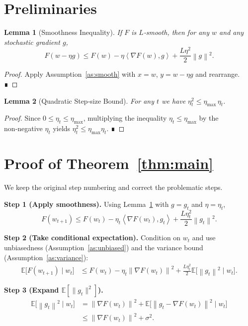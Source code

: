 \documentclass{article}
\newtheorem{lemma}{Lemma}
\newcommand{\E}{\mathbb{E}}
\newcommand{\norm}[1]{\left\|#1\right\|}
\newcommand{\inner}[2]{\left\langle #1,#2\right\rangle}
\begin{document}
\section*{Preliminaries}
\begin{lemma}[Smoothness Inequality]\label{lem:smooth}
If $F$ is $L$‑smooth, then for any $w$ and any stochastic gradient $g$,
\[
F(w-\eta g)
\le F(w)-\eta\inner{\nabla F(w)}{g}
+\frac{L\eta^{2}}{2}\norm{g}^{2}.
\]
\end{lemma}
\begin{proof}
Apply Assumption~\ref{as:smooth} with $x=w$, $y=w-\eta g$ and rearrange. ∎
\end{proof}

\begin{lemma}[Quadratic Step‑size Bound]\label{lem:quad}
For any $t$ we have $\eta_{t}^{2}\le\eta_{\max}\,\eta_{t}$.
\end{lemma}
\begin{proof}
Since $0\le\eta_{t}\le\eta_{\max}$, multiplying the inequality $\eta_{t}\le\eta_{\max}$ by the non‑negative $\eta_{t}$ yields $\eta_{t}^{2}\le\eta_{\max}\eta_{t}$. ∎
\end{proof}

\section*{Proof of Theorem~\ref{thm:main}}
We keep the original step numbering and correct the problematic steps.

\noindent\textbf{Step 1 (Apply smoothness).}  
Using Lemma~\ref{lem:smooth} with $g=g_{t}$ and $\eta=\eta_{t}$,
\[
F(w_{t+1})\le F(w_{t})-\eta_{t}\inner{\nabla F(w_{t})}{g_{t}}
+\frac{L\eta_{t}^{2}}{2}\norm{g_{t}}^{2}.
\tag{2}
\]

\noindent\textbf{Step 2 (Take conditional expectation).}  
Condition on $w_{t}$ and use unbiasedness (Assumption~\ref{as:unbiased}) and the variance bound (Assumption~\ref{as:variance}):
\[
\begin{aligned}
\E\!\big[F(w_{t+1})\mid w_{t}\big]
&\le F(w_{t})-\eta_{t}\norm{\nabla F(w_{t})}^{2}
      +\frac{L\eta_{t}^{2}}{2}\E\!\big[\norm{g_{t}}^{2}\mid w_{t}\big] .
\end{aligned}
\tag{3}
\]

\noindent\textbf{Step 3 (Expand $\E[\|g_{t}\|^{2}]$).}  
\[
\begin{aligned}
\E\!\big[\norm{g_{t}}^{2}\mid w_{t}\big]
&=\norm{\nabla F(w_{t})}^{2}
  +\E\!\big[\norm{g_{t}-\nabla F(w_{t})}^{2}\mid w_{t}\big] \\
&\le \norm{\nabla F(w_{t})}^{2}+\sigma^{2}.
\end{aligned}
\tag{4}
\]
\end{document}
